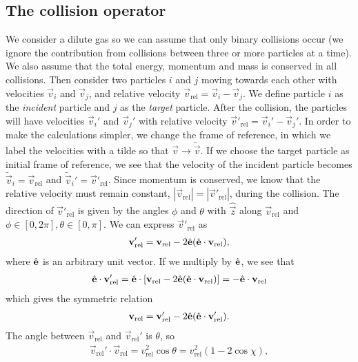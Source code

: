 \subsection{The collision operator}
\label{sec:boltzmann_collision_operator}
We consider a dilute gas so we can assume that only binary collisions occur (we ignore the contribution from collisions between three or more particles at a time). We also assume that the total energy, momentum and mass is conserved in all collisions. Then consider two particles $i$ and $j$ moving towards each other with velocities $\vec v_i$ and $\vec v_j$, and relative velocity $\vec v_\text{rel} = \vec v_i - \vec v_j$. We define particle $i$ as the \textit{incident} particle and $j$ as the \textit{target} particle. After the collision, the particles will have velocities $\vec v_i'$ and $\vec v_j'$ with relative velocity $\vec v'_\text{rel} = \vec v_i' - \vec v_j'$. In order to make the calculations simpler, we change the frame of reference, in which we label the velocities with a tilde so that $\vec v \rightarrow \tilde{\vec v}$. If we choose the target particle as initial frame of reference, we see that the velocity of the incident particle becomes $\tilde {\vec v}_i = \vec v_\text{rel}$ and $\tilde {\vec v}_i' = \vec v'_\text{rel}$. Since momentum is conserved, we know that the relative velocity must remain constant, $|\vec v_\text{rel}| = |\vec v'_\text{rel}|$, during the collision. The direction of $\vec v'_\text{rel}$ is given by the angles $\phi$ and $\theta$ with $\hat {\vec z}$ along $\vec v_\text{rel}$ and $\phi \in [0, 2\pi], \theta \in [0, \pi]$. We can express $\vec v'_\text{rel}$ as
\begin{align}
	\mathbf v_\text{rel}' = \mathbf v_\text{rel} - 2\hat {\mathbf{e}}(\hat {\mathbf{e}}\cdot\mathbf v_\text{rel}),
\end{align}
where $\hat {\mathbf{e}}$ is an arbitrary unit vector. If we multiply by $\hat {\mathbf{e}}$, we see that 
\begin{align}
	\hat {\mathbf{e}}\cdot \mathbf v_\text{rel}' = \hat {\mathbf{e}}\cdot\left[\mathbf v_\text{rel} - 2\hat {\mathbf{e}}(\hat {\mathbf{e}}\cdot\mathbf v_\text{rel})\right] = -\hat {\mathbf{e}} \cdot \mathbf v_\text{rel}
\end{align}
which gives the symmetric relation
\begin{align}
	\mathbf v_\text{rel} = \mathbf v_\text{rel}' - 2\hat {\mathbf{e}}(\hat {\mathbf{e}}\cdot\mathbf v_\text{rel}').
\end{align}
The angle between $\vec v_\text{rel}$ and $\vec v_\text{rel}'$ is $\theta$, so
\begin{align}
	\vec v_\text{rel}'\cdot \vec v_\text{rel} = v_\text{rel}^2\cos\theta = v_\text{rel}^2(1 - 2\cos \chi),
\end{align}
